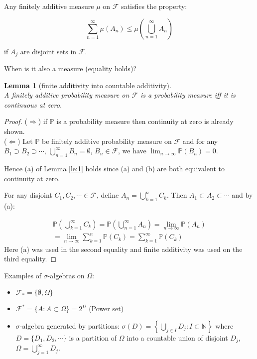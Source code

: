 \documentclass{article}
\numberwithin{equation}{section}
\newtheorem{lemma}[theorem]{Lemma}
\theoremstyle{definition}
\newcommand{\pr}{\mathbb{P}}
\newcommand{\mc}[1]{\mathcal{#1}}
\begin{document}
Any finitely additive measure $\mu$ on $\mc{F}$ satisfies the property:

\begin{equation}
    \sum_{n=1}^\infty \mu(A_n) \leq \mu\left(\bigcup_{n=1}^\infty A_n\right)
\end{equation}

if $A_j$ are disjoint sets in $\mc{F}$.

When is it also a measure (equality holds)?

\begin{lemma}[finite additivity into countable additivity]
    \label{le:2} \phantom{123123} \\
    A finitely additive probability measure on $\mc{F}$ is a probability measure iff it is continuous at zero.
\end{lemma}

\begin{proof}
    ($\Rightarrow$) if $\pr$ is a probability measure then continuity at zero is already shown. \\
    
    ($\Leftarrow$) Let $\pr$ be finitely additive probability measure on $\mc{F}$ and for any $B_1 \supset B_2 \supset \cdots$, $\bigcup_{n=1}^\infty B_n = \emptyset$, $B_n \in \mc{F}$, we have $\lim_{n\rightarrow\infty}\pr(B_n) = 0$.

    Hence (a) of Lemma \ref{le:1} holds since (a) and (b) are both equivalent to continuity at zero.

    For any disjoint $C_1, C_2,\cdots \in \mc{F}$, define $A_n = \bigcup_{k=1}^n C_k$. Then $A_1 \subset A_2 \subset \cdots$ and by (a):

    \begin{align}
        \pr\left(\bigcup_{k=1}^\infty C_k\right) = \pr\left(\bigcup_{n=1}^\infty A_n\right) = \lim_{n\rightarrow\infty}\pr(A_n) \\
        = \lim_{n\rightarrow\infty} \sum_{k=1}^n \pr(C_k) = \sum_{k=1}^\infty \pr(C_k)
    \end{align}
    Here (a) was used in the second equality and finite additivity was used on the third equality.
\end{proof}

Examples of $\sigma$-algebras on $\Omega$:
\begin{itemize}
    \item $\mc{F}_* = \{\emptyset, \Omega\}$
    \item $\mc{F}^* = \{A: A\subset\Omega\} = 2^\Omega$ (Power set)
    \item $\sigma$-algebra generated by partitions: $\sigma(D) = \left\{\bigcup_{j\in I}D_j : I\subset \mathbb{N} \right\}$ where $D = \{D_1, D_2, \cdots\}$ is a partition of $\Omega$ into a countable union of disjoint $D_j$, $\Omega = \bigcup_{j=1}^\infty D_j$.
\end{itemize}
\end{document}
